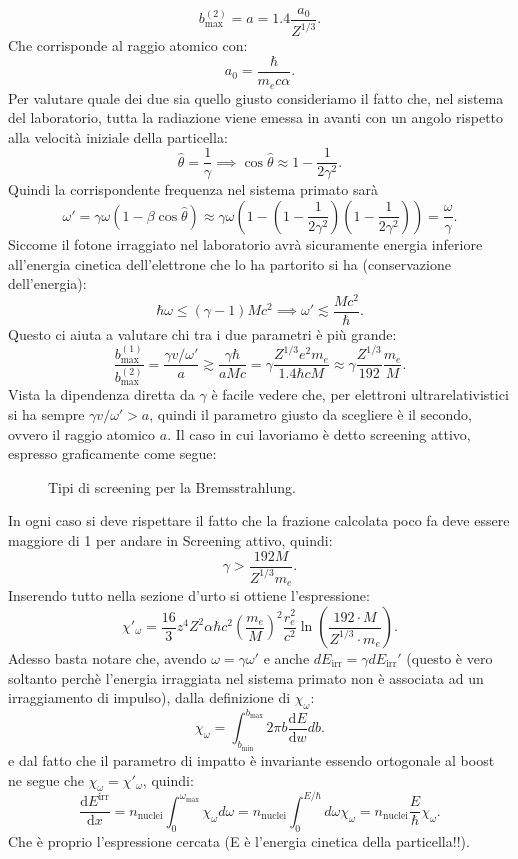 \[
	b^{\left( 2 \right) }_{\text{max}}= a =1.4 \frac{a_0}{Z^{1 /3}}
.\] 
Che corrisponde al raggio atomico con:
\[
a_0 = \frac{\hbar}{m_e c \alpha}
.\] 
Per valutare quale dei due sia quello giusto consideriamo il fatto che, nel sistema del laboratorio, tutta la radiazione viene emessa in avanti con un angolo rispetto alla velocità iniziale della particella:
\[
	\hat{\theta}=\frac{1}{\gamma} \implies \cos \hat{\theta}\approx 1-\frac{1}{2\gamma^2}
.\] 
Quindi la corrispondente frequenza nel sistema primato sarà 
\[
	\omega'=\gamma\omega\left(1-\beta\cos\hat{\theta}\right)\approx\gamma\omega\left(1-\left(1-\frac{1}{2\gamma^2}\right)\left(1-\frac{1}{2\gamma^2}\right)\right) 
	= \frac{\omega}{\gamma}
.\] 
Siccome il fotone irraggiato nel laboratorio avrà sicuramente energia inferiore all'energia cinetica dell'elettrone che lo ha partorito si ha (conservazione dell'energia):
\[
	\hbar\omega\le \left( \gamma-1 \right)Mc^2\implies\omega'\lesssim \frac{Mc^2}{\hbar}
.\] 
Questo ci aiuta a valutare chi tra i due parametri è più grande:
\[
	\frac{b^{\left( 1 \right)}_{\text{max}}}{b^{\left( 2 \right)}_{\text{max}}}=\frac{\gamma v /\omega'}{a}\gtrsim \frac{\gamma\hbar}{aMc}=
	\gamma\frac{Z^{1 /3}e^2m_e}{1.4\hbar cM}\approx \gamma\frac{Z^{1 /3}}{192}\frac{m_e}{M}
.\] 
Vista la dipendenza diretta da $\gamma$ è facile vedere che, per elettroni ultrarelativistici si ha sempre $\gamma v /\omega' > a$, quindi il parametro giusto da scegliere è il secondo, ovvero il raggio atomico $a$.
Il caso in cui lavoriamo è detto screening attivo, espresso graficamente come segue:
\begin{figure}[H]
    \centering
    \caption{Tipi di screening per la Bremsstrahlung.}
    \label{fig:screening-bremsstrahlung}
\end{figure}
In ogni caso si deve rispettare il fatto che la frazione calcolata poco fa deve essere maggiore di 1 per andare in Screening attivo, quindi:
\[
	\gamma > \frac{192M}{Z^{1 /3}m_e}
.\] 
Inserendo tutto nella sezione d'urto si ottiene l'espressione:
\[
	\chi'_{\omega}=\frac{16}{3}z^4Z^2\alpha\hbar c^2 \left( \frac{m_e}{M} \right)^2  \frac{r^2_e}{c^2}\ln\left( \frac{192\cdot M}{Z^{1 /3}\cdot m_e} \right) 
.\] 
Adesso basta notare che, avendo $\omega = \gamma \omega'$ e anche $dE_{\text{irr}} = \gamma dE_{\text{irr}}'$ (questo è vero soltanto perchè l'energia irraggiata nel sistema primato non è associata ad un irraggiamento di impulso), dalla definizione di $\chi_{\omega}$:
\[
	\chi_{\omega}=\int_{b_{\text{min}}}^{b_{\text{max}}}2\pi b \frac{\mbox{d} E}{\mbox{d} w} db
.\] 
e dal fatto che il parametro di impatto è invariante essendo ortogonale al boost ne segue che $\chi_{\omega}= \chi'_{\omega}$, quindi:
\[
	\frac{\mbox{d} E^{\text{irr}}}{\mbox{d} x} = n_{\text{nuclei}} \int_{0}^{\omega_{\text{max}}} \chi_{\omega} d\omega = 
	n_{\text{nuclei}} \int_{0}^{E /\hbar} d\omega \chi_{\omega} 
	= n_{\text{nuclei}} \frac{E}{\hbar} \chi_{\omega}
.\] 
Che è proprio l'espressione cercata (E è l'energia cinetica della particella!!).
